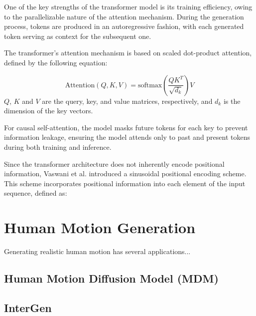 One of the key strengths of the transformer model is its training efficiency, owing to the parallelizable nature of the attention mechanism. During the generation process, tokens are produced in an autoregressive fashion, with each generated token serving as context for the subsequent one.

The transformer's attention mechanism is based on scaled dot-product attention, defined by the following equation:

\begin{equation}
    \text{Attention}(Q, K, V) = \text{softmax}\left(\frac{Q K^T}{\sqrt{d_k}} \right) V
\end{equation}
$Q$, $K$ and $V$ are the query, key, and value matrices, respectively, and $d_k$ is the dimension of the key vectors.

For causal self-attention, the model masks future tokens for each key to prevent information leakage, ensuring the model attends only to past and present tokens during both training and inference.

Since the transformer architecture does not inherently encode positional information, Vaswani et al. introduced a sinusoidal positional encoding scheme. This scheme incorporates positional information into each element of the input sequence, defined as:




\section{Human Motion Generation}













Generating realistic human motion has several applications...

\subsection{Human Motion Diffusion Model (MDM)}




\subsection{InterGen}
